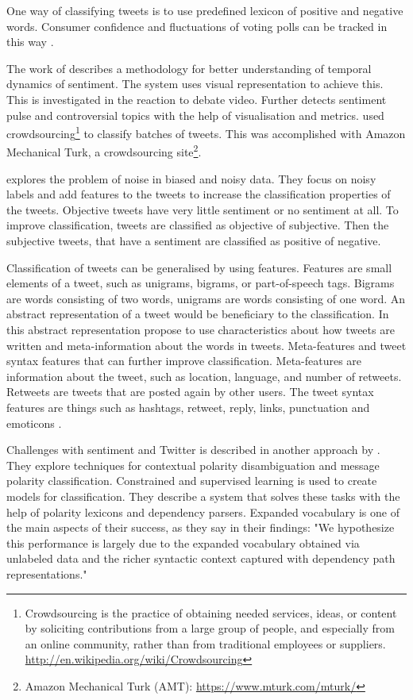 One way of classifying tweets is to use predefined lexicon of positive and
negative words. Consumer confidence and fluctuations of voting polls can be
tracked in this way \cite[]{connor2010}.

The work of \cite[]{diakopoulos2010} describes a methodology for better
understanding of temporal dynamics of sentiment. 
The system uses visual representation to achieve this. 
This is investigated in the reaction to debate video.
	Further \cite[]{diakopoulos2010} detects sentiment pulse and controversial
topics with the help of visualisation and metrics. 
	\cite[]{diakopoulos2010} used crowdsourcing\footnote{Crowdsourcing is the
practice of obtaining needed services, ideas, or content by soliciting
contributions from a large group of people, and especially from an online
community, rather than from traditional employees or suppliers.
\url{http://en.wikipedia.org/wiki/Crowdsourcing}} to classify batches of tweets.
This was accomplished with Amazon Mechanical Turk, a crowdsourcing
site\footnote{Amazon Mechanical Turk (AMT): \url{https://www.mturk.com/mturk/}}.

\cite[]{barbosa10} explores the problem of noise in biased and noisy data. 
They focus on noisy labels and add features to the tweets to increase the
classification properties of the tweets. Objective tweets have very little
sentiment or no sentiment at all. To improve classification, tweets are
classified as objective of subjective. Then the subjective tweets, that have a
sentiment are classified as positive of negative. 

Classification of tweets can be generalised by using features. Features are
small elements of a tweet, such as unigrams, bigrams, or part-of-speech tags.
Bigrams are words consisting of two words, unigrams are words consisting of one
word. An abstract representation of a tweet would be beneficiary to the
classification. In this abstract representation \cite[]{barbosa10} propose to
use characteristics about how tweets are written and meta-information about the
words in tweets.  Meta-features and tweet syntax features that can further improve
classification. Meta-features are information about the tweet, such as location,
language, and number of retweets. Retweets are tweets that are posted again by other users. The tweet syntax features are things such as hashtags, retweet,
reply, links, punctuation and emoticons \cite[]{barbosa10}. 

Challenges with sentiment and Twitter is described in another approach by 
\cite[]{becker13}. They explore techniques for contextual polarity
disambiguation and message polarity classification. Constrained and supervised
learning is used to create models for classification. They describe a system
that solves these tasks with the help of polarity lexicons and dependency
parsers. Expanded vocabulary is one of the main aspects of their success, as
they say in their findings: "We hypothesize this performance is largely due to
the expanded vocabulary obtained via unlabeled data and the richer syntactic
context captured with dependency path representations." \cite[]{becker13}

